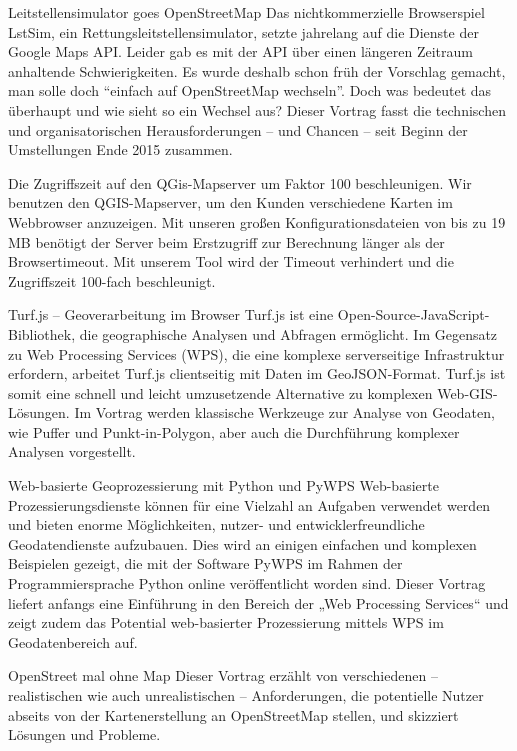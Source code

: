 %
{Leitstellensimulator goes \mbox{OpenStreetMap}}%
{}%
{Das nichtkommerzielle Browserspiel LstSim, ein Rettungsleitstellensimulator, setzte jahrelang auf die Dienste
der Google Maps API. Leider gab es mit der API über einen längeren Zeitraum anhaltende Schwierigkeiten. Es wurde
deshalb schon früh der Vorschlag gemacht, man solle doch "`einfach auf OpenStreetMap wechseln"'. Doch was bedeutet
das überhaupt und wie sieht so ein Wechsel aus? Dieser Vortrag fasst die technischen und organisatorischen
Herausforderungen -- und Chancen -- seit Beginn der Umstellungen Ende 2015 zusammen.}

%
{Die Zugriffszeit auf den QGis-Mapserver um Faktor 100 beschleunigen.}%
{}%
{Wir benutzen den QGIS-Mapserver, um den Kunden verschiedene Karten im
Webbrowser anzuzeigen. Mit unseren großen Konfigurationsdateien von bis
zu 19\,MB benötigt der Server beim Erstzugriff zur Berechnung länger als
der Browsertimeout. Mit unserem Tool wird der Timeout verhindert und die
Zugriffszeit 100-fach beschleunigt.}

%
{Turf.js -- Geoverarbeitung im \mbox{Browser}}%
{}%
{Turf.js ist eine Open-Source-JavaScript-Bibliothek, die geographische Analysen und Abfragen ermöglicht.
Im Gegensatz zu Web Processing Services (WPS), die eine komplexe serverseitige Infrastruktur erfordern,
arbeitet Turf.js clientseitig mit Daten im GeoJSON-Format. Turf.js ist somit eine schnell und leicht
umzusetzende Alternative zu komplexen Web-GIS-Lösungen.
Im Vortrag werden klassische Werkzeuge zur Analyse von Geodaten, wie Puffer und Punkt-in-Polygon, aber auch
die Durchführung komplexer Analysen vorgestellt.}

%
{Web-basierte Geoprozessierung \newline mit Python und PyWPS}%
{}%
{Web-basierte Prozessierungsdienste können für eine Vielzahl an Aufgaben verwendet werden und bieten enorme Möglichkeiten,
nutzer- und entwicklerfreundliche Geodatendienste aufzubauen. Dies wird an einigen einfachen und komplexen Beispielen gezeigt,
die mit der Software PyWPS im Rahmen der Programmiersprache Python online veröffentlicht worden sind.
Dieser Vortrag liefert anfangs eine Einführung in den Bereich der „Web Processing Services“ und zeigt
zudem das Potential web-basierter Prozessierung mittels WPS im Geodatenbereich auf. }

%
{OpenStreet mal ohne Map}%
{}%
{Dieser Vortrag erzählt von verschiedenen -- realistischen wie auch unrealistischen -- Anforderungen,
die potentielle Nutzer abseits von der Kartenerstellung an OpenStreetMap stellen, und skizziert Lösungen und Probleme.}

